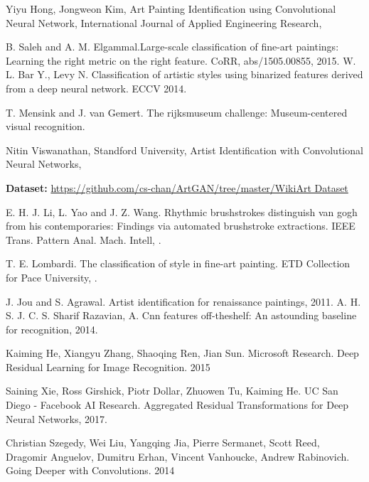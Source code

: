 \documentclass{article}
\begin{document}
\begin{thebibliography}{1}
	
	Yiyu Hong, Jongweon Kim, \newblock  Art Painting Identification using Convolutional Neural Network, \newblock International Journal of Applied Engineering Research, 
	
	B. Saleh and A. M. Elgammal.\newblock  Large-scale classification
	of fine-art paintings: Learning the right metric on the right
	feature. \newblock CoRR, abs/1505.00855, 2015.
	W. L. Bar Y., Levy N. Classification of artistic styles using binarized features derived from a deep neural network.
	ECCV 2014.
	
	T. Mensink and J. van Gemert. \newblock The rijksmuseum challenge:
	Museum-centered visual recognition. 
	
	
	Nitin Viswanathan, Standford University,
	\newblock Artist Identification with Convolutional Neural Networks, 
	
	\textbf{Dataset:}
	\url{https://github.com/cs-chan/ArtGAN/tree/master/WikiArt Dataset}
	
	E. H. J. Li, L. Yao and J. Z. Wang. \newblock Rhythmic brushstrokes
	distinguish van gogh from his contemporaries: Findings via
	automated brushstroke extractions. IEEE Trans. Pattern
	Anal. Mach. Intell, .
		
	T. E. Lombardi. \newblock The classification of style in fine-art painting. ETD Collection for Pace University, .
	
	J. Jou and S. Agrawal. Artist identification for renaissance
	paintings, 2011.
	A. H. S. J. C. S. Sharif Razavian, A. Cnn features off-theshelf: An astounding baseline for recognition, 2014.
	
	Kaiming He, Xiangyu Zhang, Shaoqing Ren, Jian Sun. Microsoft Research. 
	Deep Residual Learning for Image Recognition. 2015
	
	Saining Xie, Ross Girshick, Piotr Dollar, Zhuowen Tu, Kaiming He. UC San Diego - Facebook AI Research. Aggregated Residual Transformations for Deep Neural Networks, 2017.
	
	Christian Szegedy, Wei Liu, Yangqing Jia, Pierre Sermanet, Scott Reed, Dragomir Anguelov, Dumitru Erhan, Vincent Vanhoucke, Andrew Rabinovich. Going Deeper with Convolutions. 2014
	

\end{thebibliography}
\end{document}

